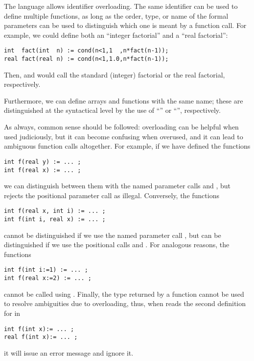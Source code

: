 The {\smart} language allows identifier overloading.
The same identifier can be used to define multiple functions, as long as
the order, type, or name of the formal parameters can be used to
distinguish which one is meant by a function call.  For example, we
could define both an ``integer factorial'' and a ``real factorial'':
\begin{lstlisting}
int  fact(int  n) := cond(n<1,1  ,n*fact(n-1));
real fact(real n) := cond(n<1,1.0,n*fact(n-1));
\end{lstlisting}
Then,  and  would call the standard
(integer) factorial or the real factorial, respectively.

\begin{comment}
Overloading also applies to arrays.  If we defined
\begin{lstlisting}
for (int i in {0..9}) {
  real f[i] := i * 1.0;
}
for (real i in {1.0..9.0..1.0}) {
  real f[i] := i * 10.0;
}
\end{lstlisting}
the expressions \Code{f[2]} and \Code{f[2.0]} would refer to the first and
second array, respectively.
\end{comment}
Furthermore, we can define arrays and functions with the same name;
these are distinguished at the syntactical level by the use of
``\Code{[]}'' or ``\Code{()}'', respectively.

As always, common sense should be followed:
overloading can be helpful when used judiciously, but it can become confusing
when overused, and it can lead to ambiguous function calls altogether.
For example, if we have defined the functions
\begin{lstlisting}
int f(real y) := ... ;
int f(real x) := ... ;
\end{lstlisting}
we can distinguish between them with the named parameter calls
 and , but {\smart} rejects the positional
parameter call  as illegal.
Conversely, the functions
\begin{lstlisting}
int f(real x, int i) := ... ;
int f(int i, real x) := ... ;
\end{lstlisting}
cannot be distinguished if we use the named parameter call
, but can be
distinguished if we use the positional calls 
and .
For analogous reasons, the functions
\begin{lstlisting}
int f(int i:=1) := ... ;
int f(real x:=2) := ... ;
\end{lstlisting}
cannot be called using .
Finally, the type returned by a function cannot be used to resolve ambiguities
due to overloading, thus, when {\smart} reads the second definition for 
in
\begin{lstlisting}
int f(int x):= ... ;
real f(int x):= ... ;
\end{lstlisting}
it will issue an error message and ignore it.




